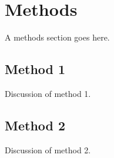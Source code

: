 \section{Methods}
A methods section goes here.

\subsection{Method 1}
Discussion of method 1.

\subsection{Method 2}
Discussion of method 2.




